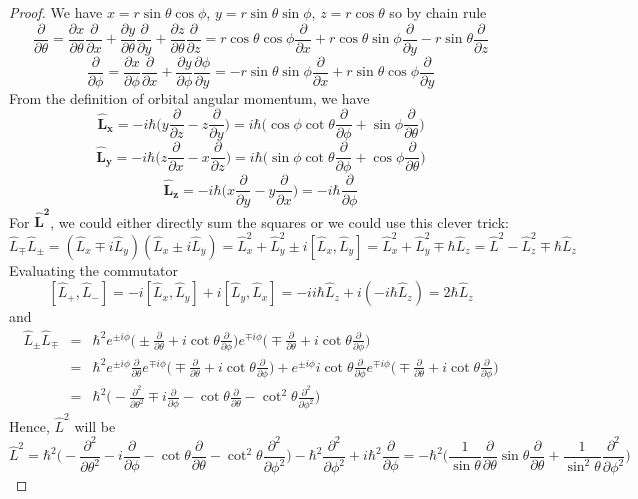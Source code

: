\documentclass[a4paper]{article}
\begin{document}
\begin{proof}
We have $x=r\sin\theta\cos\phi$, $y=r\sin\theta\sin\phi$, $z=r\cos\theta$ so by chain rule
$$\frac{\partial}{\partial\theta}=\frac{\partial x}{\partial\theta}\frac{\partial}{\partial x}+\frac{\partial y}{\partial\theta}\frac{\partial}{\partial y}+\frac{\partial z}{\partial\theta}\frac{\partial}{\partial z}=r\cos\theta\cos\phi\frac{\partial}{\partial x}+r\cos\theta\sin\phi\frac{\partial}{\partial y}-r\sin\theta\frac{\partial}{\partial z}$$
$$\frac{\partial}{\partial\phi}=\frac{\partial x}{\partial\phi}\frac{\partial}{\partial x}+\frac{\partial y}{\partial\phi}\frac{\partial\phi}{\partial y}=-r\sin\theta\sin\phi\frac{\partial}{\partial x}+r\sin\theta\cos\phi\frac{\partial}{\partial y}$$
From the definition of orbital angular momentum, we have
$$\mathbf{\hat{L}_x}=-i\hbar\bigg(y\frac{\partial}{\partial z}-z\frac{\partial}{\partial y}\bigg)=i\hbar\bigg(\cos\phi\cot\theta\frac{\partial}{\partial\phi}+\sin\phi\frac{\partial}{\partial\theta}\bigg)$$
$$\mathbf{\hat{L}_y}=-i\hbar\bigg(z\frac{\partial}{\partial x}-x\frac{\partial}{\partial z}\bigg)=i\hbar\bigg(\sin\phi\cot\theta\frac{\partial}{\partial\phi}+\cos\phi\frac{\partial}{\partial\theta}\bigg)$$
$$\mathbf{\hat{L}_z}=-i\hbar\bigg(x\frac{\partial}{\partial y}-y\frac{\partial}{\partial x}\bigg)=-i\hbar\frac{\partial}{\partial\phi}$$
For $\mathbf{\hat{L}^2}$, we could either directly sum the squares or we could use this clever trick:
$$\hat{L}_\mp\hat{L}_\pm=(\hat{L}_x\mp i\hat{L}_y)(\hat{L}_x\pm i\hat{L}_y)=\hat{L}_x^2+\hat{L}_y^2\pm i[\hat{L}_x,\hat{L}_y]=\hat{L}_x^2+\hat{L}_y^2\mp\hbar\hat{L}_z=\hat{L}^2-\hat{L}_z^2\mp\hbar\hat{L}_z$$
Evaluating the commutator
$$[\hat{L}_+,\hat{L}_-]=-i[\hat{L}_x,\hat{L}_y]+i[\hat{L}_y,\hat{L}_x]=-ii\hbar\hat{L}_z+i(-i\hbar\hat{L}_z)=2\hbar\hat{L}_z$$
and 
\begin{eqnarray}
\hat{L}_\pm\hat{L}_\mp&=&\hbar^2e^{\pm i\phi}\bigg(\pm\frac{\partial}{\partial\theta}+i\cot\theta\frac{\partial}{\partial\phi}\bigg)e^{\mp i\phi}\bigg(\mp\frac{\partial}{\partial\theta}+i\cot\theta\frac{\partial}{\partial\phi}\bigg)\nonumber\\&=&\hbar^2e^{\pm i\phi}\frac{\partial}{\partial\theta}e^{\mp i\phi}\bigg(\mp\frac{\partial}{\partial\theta}+i\cot\theta\frac{\partial}{\partial\phi}\bigg)+e^{\pm i\phi}i\cot\theta\frac{\partial}{\partial\phi}e^{\mp i\phi}\bigg(\mp\frac{\partial}{\partial\theta}+i\cot\theta\frac{\partial}{\partial\phi}\bigg)\nonumber\\&=&\hbar^2\bigg(-\frac{\partial^2}{\partial\theta^2}\mp i\frac{\partial}{\partial\phi}-\cot\theta\frac{\partial}{\partial\theta}-\cot^2\theta\frac{\partial^2}{\partial\phi^2}\bigg)
\nonumber
\end{eqnarray}
Hence, $\hat{L}^2$ will be
$$\hat{L}^2=\hbar^2\bigg(-\frac{\partial^2}{\partial\theta^2}- i\frac{\partial}{\partial\phi}-\cot\theta\frac{\partial}{\partial\theta}-\cot^2\theta\frac{\partial^2}{\partial\phi^2}\bigg)-\hbar^2\frac{\partial^2}{\partial\phi^2}+i\hbar^2\frac{\partial}{\partial\phi}=-\hbar^2\bigg(\frac{1}{\sin\theta}\frac{\partial}{\partial\theta}\sin\theta\frac{\partial}{\partial\theta}+\frac{1}{\sin^2\theta}\frac{\partial^2}{\partial\phi^2}\bigg)$$
\end{proof}
\end{document}

